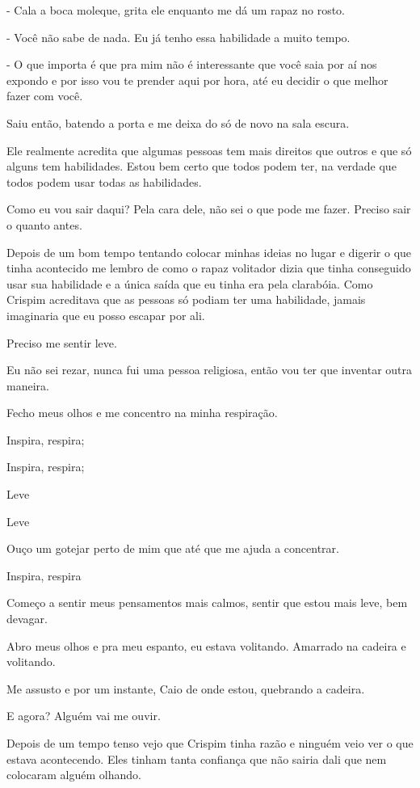 - Cala a boca moleque, grita ele enquanto me dá um rapaz no rosto.

- Você não sabe de nada. Eu já tenho essa habilidade a muito tempo.

- O que importa é que pra mim não é interessante que você saia por aí nos expondo e por isso vou te prender aqui por hora, até eu decidir o que melhor fazer com você. 

Saiu então, batendo a porta e me deixa do só de novo na sala escura.

Ele realmente acredita que algumas pessoas tem mais direitos que outros e que só alguns tem habilidades. Estou bem certo que todos podem ter, na verdade que todos podem usar todas as habilidades.

Como eu vou sair daqui? Pela cara dele, não sei o que pode me fazer. Preciso sair o quanto antes.

Depois de um bom tempo tentando colocar minhas ideias no lugar e digerir o que tinha acontecido me lembro de como o rapaz volitador dizia que tinha conseguido usar sua habilidade e a única saída que eu tinha era pela clarabóia. Como Crispim acreditava que as pessoas só podiam ter uma habilidade, jamais imaginaria que eu posso escapar por ali.

Preciso me sentir leve.

Eu não sei rezar, nunca fui uma pessoa religiosa, então vou ter que inventar outra maneira.

Fecho meus olhos e me concentro na minha respiração.

Inspira, respira;

Inspira, respira;

Leve

Leve

Ouço um gotejar perto de mim que até que me ajuda a concentrar.

Inspira, respira

Começo a sentir meus pensamentos mais calmos, sentir que estou mais leve, bem devagar.

Abro meus olhos e pra meu espanto, eu estava volitando. Amarrado na cadeira e volitando.

Me assusto e por um instante, Caio de onde estou, quebrando a cadeira.

E agora? Alguém vai me ouvir. 

Depois de um tempo tenso vejo que Crispim tinha razão e ninguém veio ver o que estava acontecendo. Eles tinham tanta confiança que não sairia dali que nem colocaram alguém olhando.

